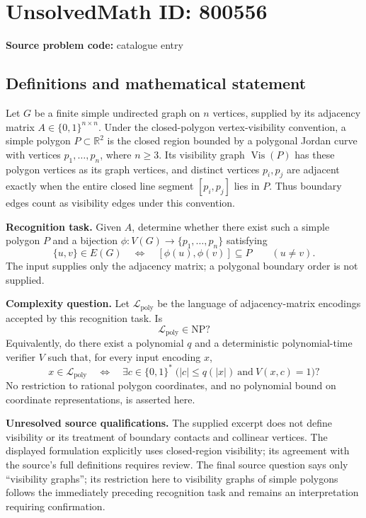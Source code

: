 \documentclass[11pt]{article}
\newcommand{\R}{\mathbb{R}}
\begin{document}
\section*{UnsolvedMath ID: 800556}
\textbf{Source problem code:} catalogue entry
\subsection{Definitions and mathematical statement}
Let \(G\) be a finite simple undirected graph on \(n\) vertices, supplied by its adjacency matrix \(A\in\{0,1\}^{n\times n}\). Under the closed-polygon vertex-visibility convention, a simple polygon \(P\subset\R^2\) is the closed region bounded by a polygonal Jordan curve with vertices \(p_1,\ldots,p_n\), where \(n\geq 3\). Its visibility graph \(\operatorname{Vis}(P)\) has these polygon vertices as its graph vertices, and distinct vertices \(p_i,p_j\) are adjacent exactly when the entire closed line segment \([p_i,p_j]\) lies in \(P\). Thus boundary edges count as visibility edges under this convention.

\textbf{Recognition task.} Given \(A\), determine whether there exist such a simple polygon \(P\) and a bijection \(\phi:V(G)\to\{p_1,\ldots,p_n\}\) satisfying
\[
\{u,v\}\in E(G)
\quad\Longleftrightarrow\quad
[\phi(u),\phi(v)]\subseteq P
\qquad(u\ne v).
\]
The input supplies only the adjacency matrix; a polygonal boundary order is not supplied.

\textbf{Complexity question.} Let \(\mathcal L_{\mathrm{poly}}\) be the language of adjacency-matrix encodings accepted by this recognition task. Is
\[
\mathcal L_{\mathrm{poly}}\in\mathrm{NP}?
\]
Equivalently, do there exist a polynomial \(q\) and a deterministic polynomial-time verifier \(V\) such that, for every input encoding \(x\),
\[
x\in\mathcal L_{\mathrm{poly}}
\quad\Longleftrightarrow\quad
\exists c\in\{0,1\}^{*}\;
\bigl(|c|\leq q(|x|)\ \text{and}\ V(x,c)=1\bigr)?
\]
No restriction to rational polygon coordinates, and no polynomial bound on coordinate representations, is asserted here.

\textbf{Unresolved source qualifications.} The supplied excerpt does not define visibility or its treatment of boundary contacts and collinear vertices. The displayed formulation explicitly uses closed-region visibility; its agreement with the source's full definitions requires review. The final source question says only ``visibility graphs''; its restriction here to visibility graphs of simple polygons follows the immediately preceding recognition task and remains an interpretation requiring confirmation.
\end{document}
